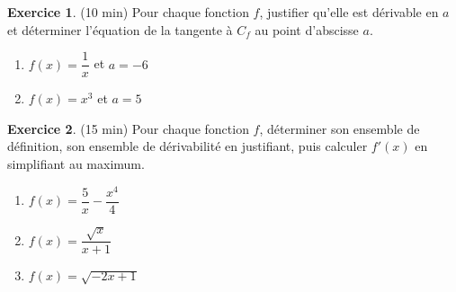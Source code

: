 \documentclass{exam}
\theoremstyle{definition}
\newtheorem{exercice}{Exercice}
\begin{document}
\begin{exercice}{(10 min)}
    Pour chaque fonction $f$, justifier qu’elle est dérivable en $a$ et déterminer l’équation de la tangente à $C_f$ au point d’abscisse $a$.
    \begin{enumerate}
        \item $f(x) = \dfrac{1}{x}$ et $a = -6$
        \item $f(x) = x^3$ et $a = 5$
    \end{enumerate}
    \end{exercice}
    
    \begin{exercice}{(15 min)}
    Pour chaque fonction $f$, déterminer son ensemble de définition, son ensemble de dérivabilité en justifiant, puis calculer $f'(x)$ en simplifiant au maximum.
    \begin{enumerate}
        \item $f(x) = \dfrac{5}{x} - \dfrac{x^4}{4}$
        \item $f(x) = \dfrac{\sqrt{x}}{x + 1}$
        \item $f(x) = \sqrt{-2x + 1}$
    \end{enumerate}
    \end{exercice}
    
\end{document}
